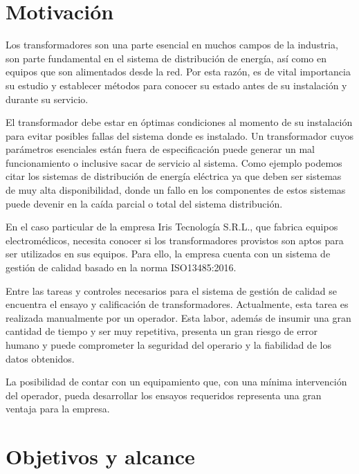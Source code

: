 
\section{Motivación}
Los transformadores son una parte esencial en muchos campos de la industria, son parte fundamental en el sistema de distribución de energía, así como en equipos que son alimentados desde la red. Por esta razón, es de vital importancia su estudio y establecer métodos para conocer su estado antes de su instalación y durante su servicio.

El transformador debe estar en óptimas condiciones al momento de su instalación para evitar posibles fallas del sistema donde es instalado. Un transformador cuyos parámetros esenciales están fuera de especificación puede generar un mal funcionamiento o inclusive sacar de servicio al sistema. Como ejemplo podemos citar los sistemas de distribución de energía eléctrica ya que deben ser sistemas de muy alta disponibilidad, donde un fallo en los componentes de estos sistemas puede devenir en la caída parcial o total del sistema distribución.

En el caso particular de la empresa Iris Tecnología S.R.L., que fabrica equipos electromédicos, necesita conocer si los transformadores provistos son aptos para ser utilizados en sus equipos. Para ello, la empresa cuenta con un sistema de gestión de calidad basado en la norma ISO13485:2016.

Entre las tareas y controles necesarios para el sistema de gestión de calidad se encuentra el ensayo y calificación de transformadores. Actualmente, esta tarea es realizada manualmente por un operador. Esta labor, además de insumir una gran cantidad de tiempo y ser muy repetitiva, presenta un gran riesgo de error humano y puede comprometer la seguridad del operario y la fiabilidad de los datos obtenidos.

La posibilidad de contar con un equipamiento que, con una mínima intervención del operador, pueda desarrollar los ensayos requeridos representa una gran ventaja para la empresa.


\section{Objetivos y alcance}

